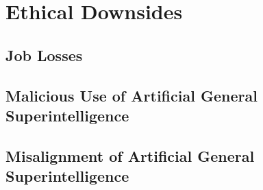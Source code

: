 \section{Ethical Downsides}

\subsection{Job Losses}
\subsection{Malicious Use of Artificial General Superintelligence}
\subsection{Misalignment of Artificial General Superintelligence}

